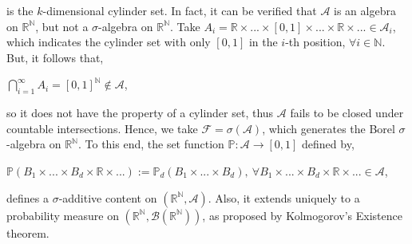 \documentclass{article}
\begin{document}
is the $k$-dimensional cylinder set. In fact, it can be verified that $\mathcal{A}$ is an algebra on $\mathbb{R}^{\mathbb{N}}$, but not a $\sigma$-algebra on $\mathbb{R}^{\mathbb{N}}$. Take $A_i = \mathbb{R}\times...\times[0,1]\times...\times\mathbb{R}\times... \in \mathcal{A}_i$, which indicates the cylinder set with only $[0,1]$ in the $i$-th position, $\forall i \in \mathbb{N}$. But, it follows that,
\begin{center}
	$\bigcap_{i=1}^{\infty}A_i = [0,1]^{\mathbb{N}} \notin \mathcal{A}$,
\end{center}
so it does not have the property of a cylinder set, thus $\mathcal{A}$ fails to be closed under countable intersections. Hence, we take $\mathcal{F} = \sigma(\mathcal{A})$, which generates the Borel $\sigma$-algebra on $\mathbb{R}^{\mathbb{N}}$. To this end, the set function $\mathbb{P}: \mathcal{A}\to[0,1]$ defined by,
\begin{center}
	$\mathbb{P}(B_1 \times ... \times B_d \times \mathbb{R} \times ...) := \mathbb{P}_{d}(B_1 \times ... \times B_d), \ \forall B_1 \times ... \times B_d \times \mathbb{R} \times ... \in \mathcal{A}$,
\end{center}
defines a $\sigma$-additive content on $(\mathbb{R}^{\mathbb{N}},\mathcal{A})$. Also, it extends uniquely to a probability measure on $(\mathbb{R}^{\mathbb{N}},\mathcal{B}(\mathbb{R}^{\mathbb{N}}))$, as proposed by Kolmogorov's Existence theorem.\\\\
\noindent{}\\\\\\
\end{document}
